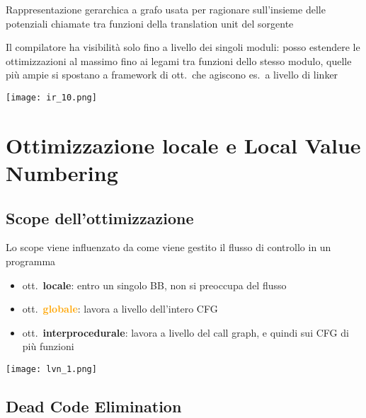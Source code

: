 \noindent\begin{minipage}[c]{.6\textwidth}
  Rappresentazione gerarchica a grafo usata per ragionare sull'insieme delle potenziali chiamate tra funzioni della translation unit del sorgente

  \begin{emphasize}[frametitle={Nota}]
    Il compilatore ha visibilit\`a solo fino a livello dei singoli moduli: posso estendere le ottimizzazioni al massimo fino ai legami tra funzioni dello stesso modulo, quelle pi\`u ampie si spostano a framework di ott.~che agiscono es.~a livello di linker
  \end{emphasize}
\end{minipage}
\begin{minipage}[c]{.4\textwidth}
  \texttt{[image: ir\_10.png]}
\end{minipage}

\section{Ottimizzazione locale e Local Value Numbering}

\subsection{Scope dell'ottimizzazione}

\noindent\begin{minipage}[c]{.55\textwidth}
  Lo scope viene influenzato da come viene gestito il flusso di controllo in un programma

  \begin{itemize}
    \item ott.~\textbf{\textcolor{Emerald}{locale}}: entro un singolo BB, non si preoccupa del flusso
    \item ott.~\textbf{\textcolor{Orange}{globale}}: lavora a livello dell'intero CFG
    \item ott.~\textbf{\textcolor{Cerulean}{interprocedurale}}: lavora a livello del call graph, e quindi sui CFG di pi\`u funzioni
  \end{itemize}
\end{minipage}\hfill
\begin{minipage}[c]{.4\textwidth}
  \texttt{[image: lvn\_1.png]}
\end{minipage}

\subsection{Dead Code Elimination}

